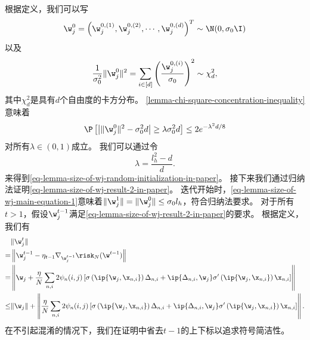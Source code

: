 \begin{myproof}
    根据定义，我们可以写
    \begin{equation}
        \w_j^0 = \left(  \w_j^{0,(1)}, \w_j^{0,(2)}, \cdots, \w_j^{0,(d)} \right)^T \sim \N(0,\sigma_0 \I)
    \end{equation}
    以及
    \begin{equation}
        \frac{1}{\sigma_0^2}\|\w_j^0\|^2 = \sum_{i \in [d]} \left( \frac{\w_j^{0,(i)}}{\sigma_0} \right)^2 \sim \chi_d^2,
    \end{equation}
    其中$\chi_d^2$是具有$d$个自由度的卡方分布。
    \cref{lemma-chi-square-concentration-inequality}意味着
    \begin{equation}\label{eq-lemma-size-of-wj-main-equation-1}
                \P \left[ \left| \|\w_j^0\|^2 - \sigma_0^2d \right| \geq \lambda \sigma_0^2 d \right] \leq 2 e^{-\lambda^2 d/8}
    \end{equation}
    对所有$ \lambda \in (0,1)$成立。
    我们可以通过令
    \begin{equation}
    \lambda = \frac{l_h^2 - d}{d}.    
    \end{equation}
    来得到\cref{eq-lemma-size-of-wj-random-initialization-in-paper}。
    接下来我们通过归纳法证明\cref{eq-lemma-size-of-wj-result-2-in-paper}。
    迭代开始时，\cref{eq-lemma-size-of-wj-main-equation-1}意味着$\|\w_j^{1}\| = \|\w_j^{0}\| \leq \sigma_0 l_h$，符合归纳法要求。
    对于所有$ t > 1$，假设$\w_j^{t-1}$满足\cref{eq-lemma-size-of-wj-result-2-in-paper}的要求。
    根据定义，我们有
    \begin{equation}\label{eq-lemma-size-of-wj-induction}
    \begin{aligned}
        & \|\w_j^{t}\| \\
        = & \left\| \w_j^{t-1} - \eta_{t-1} \nabla_{\w_j^{t-1}} \risk_N(\w^{t-1}) \right\| \\
        = & \left\|\w_j + \frac{\eta}{N} \sum_{n,i} 2 \psi_n(i,j) \left[ \sigma\left(\ip{\w_j,\x_{n,i}}   \right) \Delta_{n,i} 
        + \ip{\Delta_{n,i}, \w_j} \sigma^{\prime}\left(\ip{\w_j,\x_{n,i}}  \right) \x_{n,i} \right] \right\| \\
        \leq & \|\w_j\| + \left\| \frac{\eta}{N} \sum_{n,i} 2 \psi_n(i,j) \left[ \sigma\left(\ip{\w_j,\x_{n,i}}   \right) \Delta_{n,i} 
        + \ip{\Delta_{n,i}, \w_j} \sigma^{\prime}\left(\ip{\w_j,\x_{n,i}}  \right) \x_{n,i} \right] \right\|.
    \end{aligned}
    \end{equation}
    在不引起混淆的情况下，我们在证明中省去$t-1$的上下标以追求符号简洁性。

\end{myproof}
